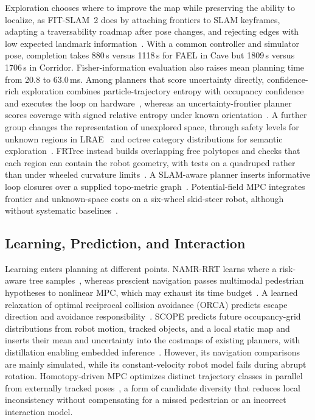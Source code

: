 Exploration chooses where to improve the map while preserving the ability to localize, as FIT-SLAM~2 does by attaching frontiers to SLAM keyframes, adapting a traversability roadmap after pose changes, and rejecting edges with low expected landmark information~\cite{P_E13}. With a common controller and simulator pose, completion takes 880\,s versus 1118\,s for FAEL in Cave but 1809\,s versus 1706\,s in Corridor. Fisher-information evaluation also raises mean planning time from 20.8 to 63.0\,ms. Among planners that score uncertainty directly, confidence-rich exploration combines particle-trajectory entropy with occupancy confidence and executes the loop on hardware~\cite{P_E14}, whereas an uncertainty-frontier planner scores coverage with signed relative entropy under known orientation~\cite{P_E12}. A further group changes the representation of unexplored space, through safety levels for unknown regions in LRAE~\cite{P_M14} and octree category distributions for semantic exploration~\cite{P_M31}. FRTree instead builds overlapping free polytopes and checks that each region can contain the robot geometry, with tests on a quadruped rather than under wheeled curvature limits~\cite{P_M05}. A SLAM-aware planner inserts informative loop closures over a supplied topo-metric graph~\cite{P_N05}. Potential-field MPC integrates frontier and unknown-space costs on a six-wheel skid-steer robot, although without systematic baselines~\cite{P_S02}.

\subsection{Learning, Prediction, and Interaction}

Learning enters planning at different points. NAMR-RRT learns where a risk-aware tree samples~\cite{P_M08}, whereas prescient navigation passes multimodal pedestrian hypotheses to nonlinear MPC, which may exhaust its time budget~\cite{P_M30}. A learned relaxation of optimal reciprocal collision avoidance (ORCA) predicts escape direction and avoidance responsibility~\cite{P_M19}. SCOPE predicts future occupancy-grid distributions from robot motion, tracked objects, and a local static map and inserts their mean and uncertainty into the costmaps of existing planners, with distillation enabling embedded inference~\cite{P_R18}. However, its navigation comparisons are mainly simulated, while its constant-velocity robot model fails during abrupt rotation. Homotopy-driven MPC optimizes distinct trajectory classes in parallel from externally tracked poses~\cite{P_S09}, a form of candidate diversity that reduces local inconsistency without compensating for a missed pedestrian or an incorrect interaction model.

